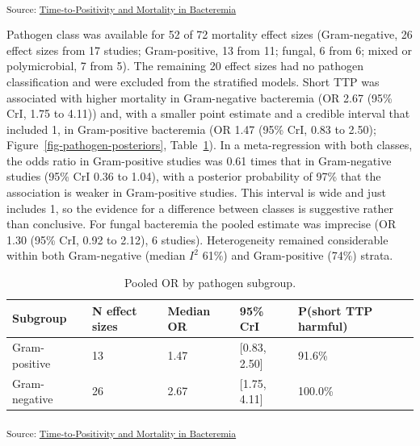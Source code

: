 \documentclass[
  11pt,
]{article}
\begin{document}
\textsubscript{Source:
\href{https://lewis-id-lab.github.io/ttp-bacteremia-meta-analysis/notebooks/mortality-analysis-preview.html\#cell-fig-pathogen-posteriors}{Time-to-Positivity
and Mortality in Bacteremia}}

Pathogen class was available for 52 of 72 mortality effect sizes
(Gram-negative, 26 effect sizes from 17 studies; Gram-positive, 13 from
11; fungal, 6 from 6; mixed or polymicrobial, 7 from 5). The remaining
20 effect sizes had no pathogen classification and were excluded from
the stratified models. Short TTP was associated with higher mortality in
Gram-negative bacteremia (OR 2.67 (95\% CrI, 1.75 to 4.11)) and, with a
smaller point estimate and a credible interval that included 1, in
Gram-positive bacteremia (OR 1.47 (95\% CrI, 0.83 to 2.50);
Figure~\ref{fig-pathogen-posteriors}, Table~\ref{tbl-subgroup}). In a
meta-regression with both classes, the odds ratio in Gram-positive
studies was 0.61 times that in Gram-negative studies (95\% CrI 0.36 to
1.04), with a posterior probability of 97\% that the association is
weaker in Gram-positive studies. This interval is wide and just includes
1, so the evidence for a difference between classes is suggestive rather
than conclusive. For fungal bacteremia the pooled estimate was imprecise
(OR 1.30 (95\% CrI, 0.92 to 2.12), 6 studies). Heterogeneity remained
considerable within both Gram-negative (median \(I^2\) 61\%) and
Gram-positive (74\%) strata.

{

\begin{longtable}[]{@{}lllll@{}}

\caption{\label{tbl-subgroup}Pooled OR by pathogen subgroup.}

\tabularnewline

\toprule\noalign{}
Subgroup & N effect sizes & Median OR & 95\% CrI & P(short TTP
harmful) \\
\midrule\noalign{}
\endhead
\bottomrule\noalign{}
\endlastfoot
Gram-positive & 13 & 1.47 & {[}0.83, 2.50{]} & 91.6\% \\
Gram-negative & 26 & 2.67 & {[}1.75, 4.11{]} & 100.0\% \\

\end{longtable}

}

\textsubscript{Source:
\href{https://lewis-id-lab.github.io/ttp-bacteremia-meta-analysis/notebooks/mortality-analysis-preview.html\#cell-tbl-subgroup}{Time-to-Positivity
and Mortality in Bacteremia}}
\end{document}
